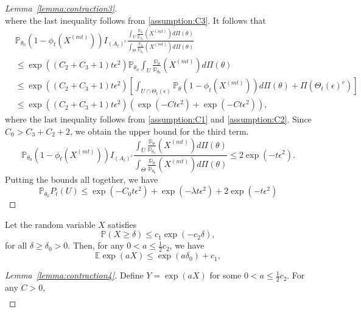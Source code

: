 \documentclass[twoside,11pt]{article}
\numberwithin{equation}{section}
\newcommand{\E}{\mathbb{E}}
\newcommand\bP{\mathbb{P}}
\newcommand\bp{\mathbb{p}}
\begin{document}
{\begin{proof}[Lemma~\ref{lemma:contraction3}]
\begin{equation*}
\end{equation*}
where the last inequality follows from \ref{assumption:C3}. It follows that
\begin{align*}
  &\bP_{\theta_0} (1 - \phi_t(X^{(mt)})) I_{(A_t)^c} \frac{\int_{U} \frac{\bp_\theta}{\bp_{\theta_0}}(X^{(mt)}) d \Pi(\theta)}{\int_{\Theta} \frac{\bp_\theta}{\bp_{\theta_0}}(X^{(mt)}) d \Pi(\theta)} \\
  &\leq \exp((C_2 + C_3 + 1) t \epsilon^2)\bP_{\theta_0} \int_{U} \frac{\bp_\theta}{\bp_{\theta_0}}(X^{(mt)}) d \Pi(\theta) \\
  &\leq \exp((C_2 + C_3 + 1) t \epsilon^2)\left[\int_{U \cap \Theta_t(\epsilon)} \bP_\theta (1- \phi_t (X^{(mt)})) d \Pi(\theta) + \Pi\left(\Theta_t(\epsilon)^c\right) \right] \\
 & \leq \exp((C_2 + C_3 + 1) t \epsilon^2)(\exp(-C t \epsilon^2) + \exp(-C t \epsilon^2)), 
\end{align*}
where the last inequality follows from \ref{assumption:C1} and \ref{assumption:C2}. Since $C_0 > C_3 + C_2 + 2$, we obtain the upper bound for the third term. 
\begin{equation*}
    \bP_{\theta_0} (1 - \phi_t(X^{(mt)})) I_{(A_t)^c} \frac{\int_{U} \frac{\bp_\theta}{\bp_{\theta_0}}(X^{(mt)}) d \Pi(\theta)}{\int_{\Theta} \frac{\bp_\theta}{\bp_{\theta_0}}(X^{(mt)}) d \Pi(\theta)}  \leq 2 \exp(- t \epsilon^2). 
\end{equation*}
Putting the bounds all together, we have
\begin{equation*}
    \bP_{\theta_0}  P_t (U) \leq \exp(-C_0 t \epsilon^2) + \exp(-\lambda t \epsilon^2) + 2 \exp(-t \epsilon^2)
\end{equation*}
\end{proof}
\begin{lemma}\label{lemma:contraction4}
    Let the random variable $X$ satisfies
    \begin{equation*}
        \bP(X \geq \delta) \leq c_1 \exp(-c_2 \delta), 
    \end{equation*}
    for all $\delta \geq \delta_0 > 0$. Then, for any $0 < a \leq \frac{1}{2} c_2$, we have
    \begin{equation*}
        \E \exp(a X) \leq \exp(a \delta_0) + c_1, 
    \end{equation*}
\end{lemma}
\begin{proof}[Lemma~\ref{lemma:contraction4}]
    Define $Y = \exp(aX)$ for some $0 < a \leq \frac{1}{2}c_2$. For any $C > 0$, 
    \begin{align*}

\end{align*}
\end{proof}}
\end{document}
